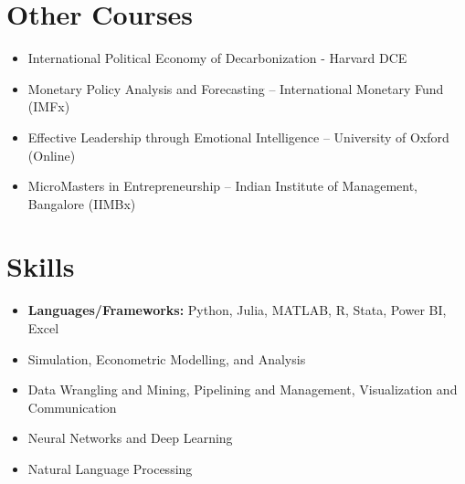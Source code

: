 \documentclass[11pt,a4paper,sans]{moderncv}
\newcommand*{\mycomment}[1]{}
\begin{document}
\section{Other Courses}
{\begin{itemize}[label=\textbullet]
    \item International Political Economy of Decarbonization - Harvard DCE
    \item Monetary Policy Analysis and Forecasting – International Monetary Fund (IMFx)
    \item Effective Leadership through Emotional Intelligence – University of Oxford (Online)
    \item MicroMasters in Entrepreneurship – Indian Institute of Management, Bangalore (IIMBx)

  \end{itemize}}

\section{Skills}
{\begin{itemize}[label=\textbullet]
\item {\textbf{Languages/Frameworks:} Python, Julia, MATLAB, R, Stata, Power BI, Excel}
\item Simulation, Econometric Modelling, and Analysis
\item Data Wrangling and Mining, Pipelining and Management, Visualization and Communication
\item Neural Networks and Deep Learning
\item Natural Language Processing
\end{itemize}}

\mycomment{
\section{Languages}
\begin{multicols}{2}
    \begin{itemize}[label=\textbullet]
    \item \textbf{English} [Native]
    \item {\textbf{French} [Basic] - Learning}
    \item {\textbf{Hindi} [Basic]}
    \end{itemize}
\end{multicols}}
\end{document}
